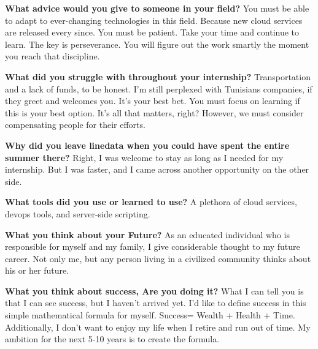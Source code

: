 \textbf{What advice would you give to someone in your field?}\newline
You must be able to adapt to ever-changing technologies in this field. Because new cloud services are released every since. You must be patient. Take your time and continue to learn. The key is perseverance. You will figure out the work smartly the moment you reach that discipline.\newline

\textbf{What did you struggle with throughout your internship?}\newline
Transportation and a lack of funds, to be honest. I'm still perplexed with Tunisians companies, if they greet and welcomes you. It's your best bet. You must focus on learning if this is your best option. It's all that matters, right? However, we must consider compensating people for their efforts.
\newline

\textbf{Why did you leave linedata when you could have spent the entire summer there?}\newline
Right, I was welcome to stay as long as I needed for my internship. But I was faster, and I came across another opportunity on the other side.
\newline

\textbf{What tools did you use or learned to use?}\newline
A plethora of cloud services, devops tools, and server-side scripting.
\newline

\textbf{What you think about your Future?}\newline
As an educated individual who is responsible for myself and my family, I give considerable thought to my future career. Not only me, but any person living in a civilized community thinks about his or her future. 
\newline

\textbf{What you think about success, Are you doing it?}\newline
What I can tell you is that I can see success, but I haven't arrived yet. I'd like to define success in this simple mathematical formula for myself.
Success= Wealth + Health + Time. Additionally, I don't want to enjoy my life when I retire and run out of time. My ambition for the next 5-10 years is to create the formula.